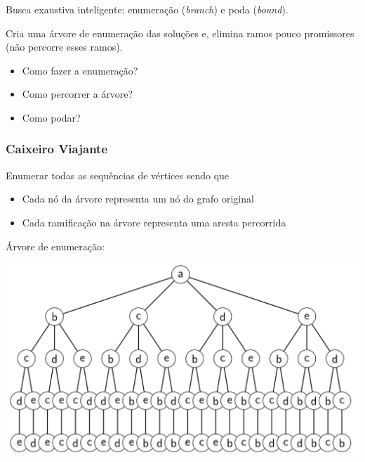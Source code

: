 Busca exaustiva inteligente: enumeração (\textit{branch}) e poda (\textit{bound}).

Cria uma árvore de enumeração das soluções e, elimina ramos pouco promissores (não percorre esses ramos).

\begin{itemize}
    \item Como fazer a enumeração?
    \item Como percorrer a árvore?
    \item Como podar?
\end{itemize}

\subsubsection{Caixeiro Viajante}

Enumerar todas as sequências de vértices sendo que

\begin{itemize}
    \item Cada nó da árvore representa um nó do grafo original
    \item Cada ramificação na árvore representa uma aresta percorrida
\end{itemize}

\begin{example}
    \centering
\end{example}

Árvore de enumeração:

\begin{example}
    \centering
    \includegraphics[width=.95\linewidth]{img/arvore_enumeracao_tsp.png}
\end{example}

